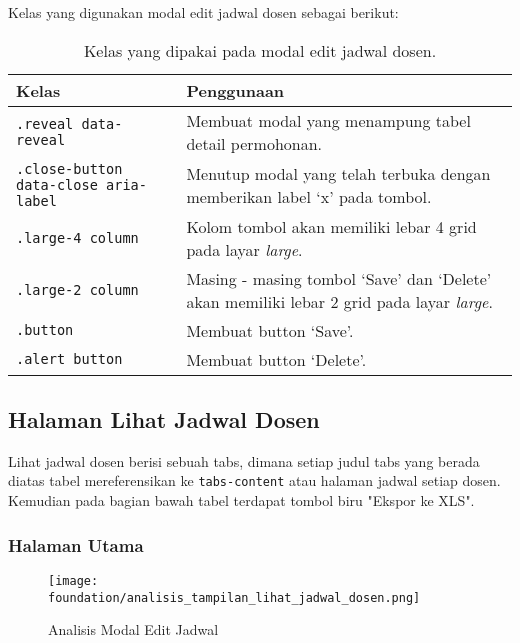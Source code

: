 Kelas yang digunakan modal edit jadwal dosen sebagai berikut:
\begin{table}[H]
	\centering
	\begin{tabularx}{\textwidth}{lX}
		\toprule
		Kelas     & Penggunaan \\
		\midrule
		\texttt{.reveal data-reveal} & Membuat modal yang menampung tabel detail permohonan.\\
		\texttt{.close-button data-close aria-label} & Menutup modal yang telah terbuka dengan memberikan label `x' pada tombol.\\
		\texttt{.large-4 column} & Kolom tombol akan memiliki lebar 4 grid pada layar \textit{large}.\\
		\texttt{.large-2 column} & Masing - masing tombol `Save' dan `Delete' akan memiliki lebar 2 grid pada layar \textit{large}.\\
		\texttt{.button} & Membuat button `Save'.\\
		\texttt{.alert button} & Membuat button `Delete'.\\
		\bottomrule
	\end{tabularx}%
	\caption{Kelas yang dipakai pada modal edit jadwal dosen.}
\end{table}


\subsection{Halaman Lihat Jadwal Dosen}
\noindent Lihat jadwal dosen berisi sebuah tabs, dimana setiap judul tabs yang berada diatas tabel mereferensikan ke \texttt{tabs-content} atau halaman jadwal setiap dosen. Kemudian pada bagian bawah tabel terdapat tombol biru "Ekspor ke XLS".
\subsubsection{Halaman Utama}
\begin{figure} [H]
	\centering  
	\texttt{[image: foundation/analisis\_tampilan\_lihat\_jadwal\_dosen.png]}
	\caption{Analisis Modal Edit Jadwal}
\end{figure}

